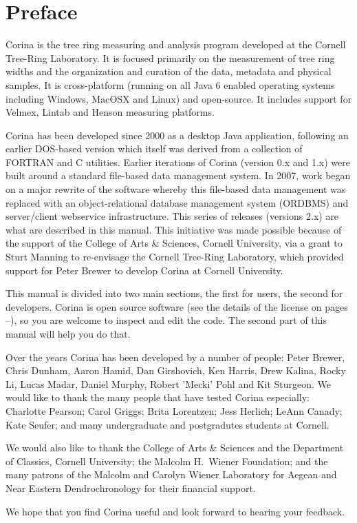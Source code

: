 \section*{Preface}
\thispagestyle{empty} 

Corina is the tree ring measuring and analysis program developed at the Cornell Tree-Ring Laboratory. It is focused primarily on the measurement of tree ring widths and the organization and curation of the data, metadata and physical samples. It is cross-platform (running on all Java 6 enabled operating systems including Windows, MacOSX and Linux) and open-source. It includes support for Velmex, Lintab and Henson measuring platforms.

Corina has been developed since 2000 as a desktop Java application, following an earlier DOS-based version which itself was derived from a collection of FORTRAN and C utilities. Earlier iterations of Corina (version 0.x and 1.x) were built around a standard file-based data management system. In 2007, work began on a major rewrite of the software whereby this file-based data management was replaced with an object-relational database management system (ORDBMS) and server/client webservice infrastructure. This series of releases (versions 2.x) are what are described in this manual.  This initiative was made possible because of the support of the College of Arts \& Sciences, Cornell University, via a grant to Sturt Manning to re-envisage the Cornell Tree-Ring Laboratory, which provided support for Peter Brewer to develop Corina at Cornell University.

This manual is divided into two main sections, the first for users, the second for developers.  Corina is open source software (see the details of the license on pages \pageref{txt:licenseStart}--\pageref{txt:licenseEnd}), so you are welcome to inspect and edit the code.  The second part of this manual will help you do that.

Over the years Corina has been developed by a number of people: Peter Brewer, Chris Dunham, Aaron Hamid, Dan Girshovich, Ken Harris, Drew Kalina, Rocky Li, Lucas Madar, Daniel Murphy, Robert 'Mecki' Pohl and Kit Sturgeon.  We would like to thank the many people that have tested Corina especially: Charlotte Pearson; Carol Griggs; Brita Lorentzen; Jess Herlich; LeAnn Canady; Kate Seufer; and many undergraduate and postgradutes students at Cornell.  

We would also like to thank the College of Arts \& Sciences and the Department of Classics, Cornell University; the Malcolm H.\ Wiener Foundation; and the many patrons of the Malcolm and Carolyn Wiener Laboratory for Aegean and Near Eastern Dendrochronology for their financial support.  

We hope that you find Corina useful and look forward to hearing your feedback.  



